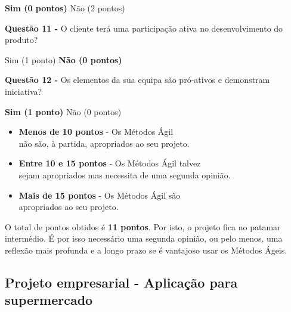 \begin{framed}
\newline \begin{center} \textbf{Sim (0 pontos)} \hspace{30mm} Não (2 pontos)\end{center}
\vspace{2mm}
\newline\textbf{Questão 11 - } O cliente terá uma participação ativa no desenvolvimento do produto?
\newline \begin{center} Sim (1 ponto) \hspace{30mm} \textbf{Não (0 pontos)}\end{center}
\vspace{2mm}
\newline\textbf{Questão 12 - } Os elementos da sua equipa são pró-ativos e demonstram iniciativa?
\newline \begin{center}\textbf{Sim (1 ponto)} \hspace{30mm} Não (0 pontos)\end{center}

\vspace{10mm}
\begin{center}
\begin{itemize}
    \item \textbf{Menos de 10 pontos} - Os Métodos Ágil \\não são, à partida, apropriados ao seu projeto.
    \item \textbf{Entre 10 e 15 pontos} - Os Métodos Ágil talvez \\sejam apropriados mas necessita de uma segunda opinião.
    \item \textbf{Mais de 15 pontos} - Os Métodos Ágil são\\ apropriados ao seu projeto.
\end{itemize}
\end{center}
\end{framed}

O total de pontos obtidos é \textbf{11 pontos}. Por isto, o projeto fica no patamar intermédio. É por isso necessário uma segunda opinião, ou pelo menos, uma reflexão mais profunda e a longo prazo se é vantajoso usar os Métodos Ágeis.

\newpage

\subsection{Projeto empresarial - Aplicação para supermercado}

